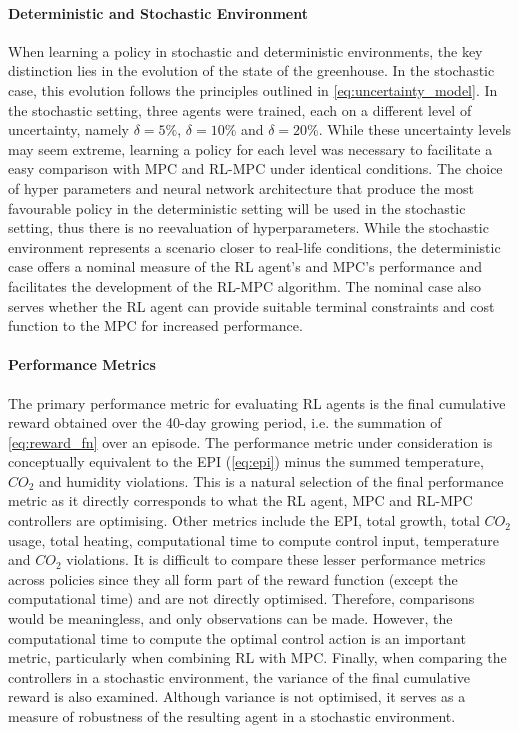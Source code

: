 \paragraph{Deterministic and Stochastic Environment}
When learning a policy in stochastic and deterministic environments, the key distinction lies in the evolution of the state of the greenhouse. In the stochastic case, this evolution follows the principles outlined in \autoref{eq:uncertainty_model}. In the stochastic setting, three agents were trained, each on a different level of uncertainty, namely $\delta = 5\%$, $\delta = 10\%$ and $\delta = 20\%$. While these uncertainty levels may seem extreme, learning a policy for each level was necessary to facilitate a easy comparison with MPC and RL-MPC under identical conditions. The choice of hyper parameters and neural network architecture that produce the most favourable policy in the deterministic setting will be used in the stochastic setting, thus there is no reevaluation of hyperparameters. While the stochastic environment represents a scenario closer to real-life conditions, the deterministic case offers a nominal measure of the RL agent's and MPC's performance and facilitates the development of the RL-MPC algorithm. The nominal case also serves whether the RL agent can provide suitable terminal constraints and cost function to the MPC for increased performance.

\paragraph{Performance Metrics}
The primary performance metric for evaluating RL agents is the final cumulative reward obtained over the 40-day growing period, i.e. the summation of \autoref{eq:reward_fn} over an episode. The performance metric under consideration is conceptually equivalent to the EPI (\autoref{eq:epi}) minus the summed temperature, $CO_2$ and humidity violations. This is a natural selection of the final performance metric as it directly corresponds to what the RL agent, MPC and RL-MPC controllers are optimising. Other metrics include the EPI, total growth, total $CO_2$ usage, total heating, computational time to compute control input, temperature and $CO_2$ violations. It is difficult to compare these lesser performance metrics across policies since they all form part of the reward function (except the computational time) and are not directly optimised. Therefore, comparisons would be meaningless, and only observations can be made. However, the computational time to compute the optimal control action is an important metric, particularly when combining RL with MPC. Finally, when comparing the controllers in a stochastic environment, the variance of the final cumulative reward is also examined. Although variance is not optimised, it serves as a measure of robustness of the resulting agent in a stochastic environment.

